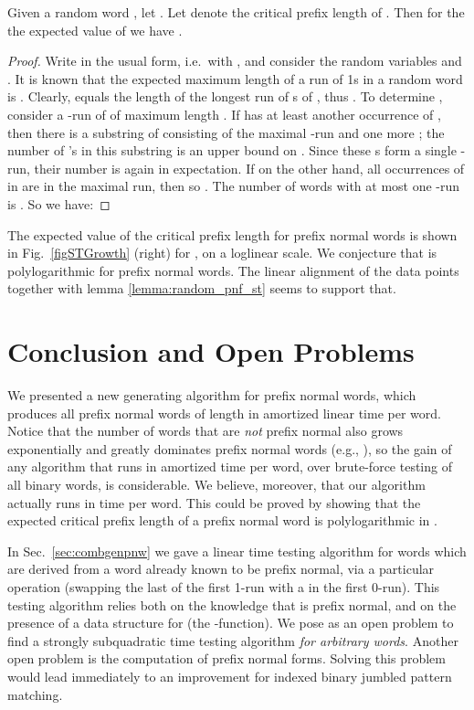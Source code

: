 \documentclass[11pt,a4paper]{llncs}
\begin{document}
\begin{lemma}\label{lemma:random_pnf_st}
Given a random word , let . Let  denote the critical prefix length of . Then for the the expected value of  we have .
\end{lemma}

\begin{proof} 
Write  in the usual form, i.e.\ with , and consider the random variables  and . It is known that the expected maximum length of a run of 1s in a random word is \cite{GO80}. Clearly,  equals the length of the longest run of s of , thus . To determine , consider a -run of  of maximum length . If  has at least another occurrence of , then there is a substring of  consisting of the maximal -run and one more ; the number of 's in this substring is an upper bound on . Since these s form a single -run, their number is again  in expectation. If on the other hand, all occurrences of  in  are in the maximal run, then  so . The number of words with at most one -run is . So we have: 

\end{proof}


The expected value of the critical prefix length for prefix normal words is shown in Fig.~\ref{figSTGrowth} (right) for , on a loglinear scale. We conjecture that  is polylogarithmic for prefix normal words. The linear alignment of the data points together with lemma \ref{lemma:random_pnf_st} seems to support that.







\section{Conclusion and Open Problems}


We presented a new generating algorithm for prefix normal words, which produces all prefix normal words of length  in amortized linear  time per word. Notice that the number of words that are {\em not} prefix normal also grows exponentially and greatly dominates prefix normal words (e.g., ), so the gain of any algorithm that runs in amortized time per word, over brute-force testing of all binary words, is considerable. 
We believe, moreover, that our algorithm actually runs in time  per word. This could be proved by showing that the expected critical prefix length of a prefix normal word is polylogarithmic in .

In Sec.~\ref{sec:combgenpnw} we gave a linear time testing algorithm for words which are derived from a word  already known to be prefix normal, via a particular operation (swapping the last  of the first 1-run with a  in the first 0-run). This testing algorithm relies both on the knowledge that  is prefix normal, and on the presence of a data structure for  (the -function). We pose as an open problem to find a strongly subquadratic time testing algorithm {\em for arbitrary words}. Another open problem is the computation of prefix normal forms. 
Solving this problem would lead immediately to an improvement for indexed binary jumbled pattern matching.
\end{document}

